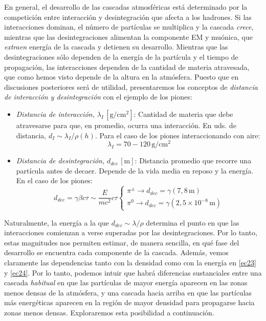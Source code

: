 \documentclass[12 pt, a4paper]{article} %
\numberwithin{equation}{section}
\numberwithin{figure}{section}
\numberwithin{table}{section}
\begin{document}
En general, el desarrollo de las cascadas atmosféricas está determinado por la competición entre interacción y desintegración que afecta a los hadrones. Si las interacciones dominan, el número de partículas se multiplica y la cascada \textit{crece}, mientras que las desintegraciones alimentan la componente EM y muónica, que \textit{extraen} energía de la cascada y detienen su desarrollo. Mientras que las desintegraciones sólo dependen de la energía de la partícula y el tiempo de propagación, las interacciones dependen de la cantidad de materia atravesada, que como hemos visto depende de la altura en la atmósfera. Puesto que en discusiones posteriores será de utilidad, presentaremos los conceptos de \textit{distancia de interacción y desintegración} con el ejemplo de los piones:
\begin{itemize}
	\item \textit{Distancia de interacción,} $\lambda_I\,\left[\mathrm{g/cm^2}\right]$: Cantidad de materia que debe atravesarse para que, en promedio, ocurra una interacción. En uds. de distancia, $d_I\sim\lambda_I/\rho(h)$. Para el caso de los piones interaccionando con aire:
\begin{equation}
		\lambda_I=70-120\,\mathrm{g/cm^2}\label{ec23}
\end{equation}

\item \textit{Distancia de desintegración, }$d_{dec}\,\left[\mathrm{m}\right]$: Distancia promedio que recorre una partícula antes de decaer. Depende de la vida media en reposo y la energía. En el caso de los piones:
\begin{equation}
	d_{dec}=\gamma\beta c\tau\sim\frac{E}{mc^2}c\tau\left\{\begin{array}{l}\pi^\pm\rightarrow d_{dec}=\gamma\left(7,8 \,\mathrm{m}\right)\\
\pi^0\rightarrow d_{dec}=\gamma\left(2,5\times10^{-8}\,\mathrm{m}\right)\end{array}\right.
\label{ec24}
\end{equation}
\end{itemize}
Naturalmente, la energía a la que $d_{dec}\sim\lambda/\rho$ determina el punto en que las interacciones comienzan a verse superadas por las desintegraciones. Por lo tanto, estas magnitudes nos permiten estimar, de manera sencilla, en qué fase del desarrollo se encuentra cada componente de la cascada. Además, vemos claramente las dependencias tanto con la densidad como con la energía en \eqref{ec23} y \eqref{ec24}. Por lo tanto, podemos intuir que habrá diferencias sustanciales entre una cascada \textit{habitual} en que las partículas de mayor energía aparecen en las zonas menos densas de la atmósfera, y una cascada hacia arriba en que las partículas más energéticas aparecen en la región de mayor densidad para propagarse hacia zonas menos densas. Exploraremos esta posibilidad a continuación.
\end{document}
